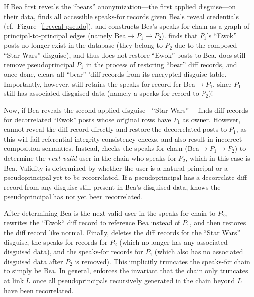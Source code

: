 If Bea first reveals the ``bears'' anonymization---the first applied
disguise---on their data, \sys finds all accessible speaks-for records given
Bea's reveal credentials (cf.\ Figure~\ref{f:reveal-pseudo}), and constructs Bea's
speaks-for chain as a graph of principal-to-principal edges (namely Bea$\to
P_1\to P_2$).
%
\sys finds that $P_1$'s ``Ewok'' posts no longer exist in the database (they belong to
$P_2$ due to the composed ``Star Wars'' disguise), and thus does not restore 
``Ewok'' posts to Bea. \sys does still remove pseudoprincipal $P_1$ in the process
of restoring ``bear'' diff records, and once done, clears all ``bear'' 'diff
records from its encrypted disguise table. 
%
Importantly, however, \sys still retains the speaks-for record for Bea$\to P_1$,
since $P_1$ still has associated disguised data (namely a speaks-for record to $P_2$)!
%

%
Now, if Bea reveals the second applied disguise---``Star Wars''---\sys
finds diff records for decorrelated ``Ewok'' posts whose original rows have $P_1$ as
owner. 
%
However, \sys cannot reveal the diff record directly and restore the
decorrelated posts to $P_1$, as this will fail referential integrity consistency
checks, and also result in incorrect composition semantics. Instead, \sys checks
the speaks-for chain (Bea$\to P_1 \to P_2$) to determine the \emph{next valid}
user in the chain who speaks-for $P_2$, which in this case is Bea.
%
Validity is determined by whether the user is a natural principal or a
pseudoprincipal yet to be recorrelated. If a pseudoprincipal has a decorrelate
diff record from any disguise still present in Bea's disguised data, \sys knows
the pseudoprincipal has not yet been recorrelated.
%

%
After determining Bea is the next valid user in the speaks-for chain to $P_2$,
\sys rewrites the ``Ewok`` diff record to reference Bea instead of $P_1$,
and then restores the diff record like normal.
%
Finally, \sys deletes the diff records for the ``Star Wars'' disguise, the
speaks-for records for $P_2$ (which no longer has any associated disguised
data), and the speaks-for records for $P_1$ (which also has no associated
disguised data after $P_2$ is removed).
%
This implicitly truncates the speaks-for chain to simply be Bea.
%
In general, \sys enforces the invariant that the chain only truncates at link
$L$ once all pseudoprincipals recursively generated in the chain beyond $L$ have
been recorrelated.
%


